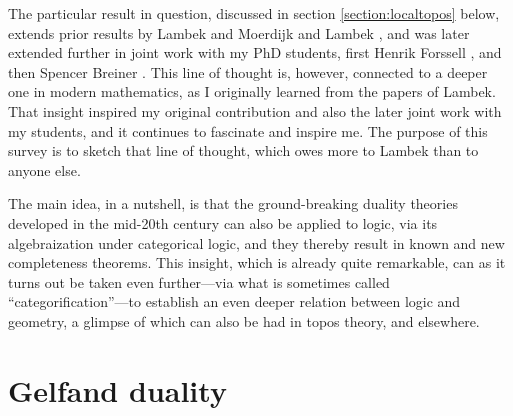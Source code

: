 \documentclass[12pt]{article}
\theoremstyle{remark}
\theoremstyle{definition}
\begin{document}
The particular result in question, discussed in section \ref{section:localtopos} below, extends prior results by Lambek and Moerdijk \cite{LM} and Lambek \cite{L2}, and was later extended further in joint work with my  PhD students, first Henrik Forssell \cite{AF}, and then Spencer Breiner \cite{B}.  This line of thought is, however, connected to a deeper one in modern mathematics, as I originally learned from the papers of Lambek.  That insight inspired  my  original contribution and also the later joint work with my students, and it continues to fascinate and inspire me.   The purpose of this survey is to sketch that line of thought, which owes more to Lambek than to anyone else.  

The main idea, in a nutshell, is that the ground-breaking duality theories developed in the mid-20th century can also be applied to logic, via its algebraization under categorical logic, and they thereby result in known and new completeness theorems.  This insight, which is already quite remarkable, can as it turns out be taken even further---via what is sometimes called ``categorification''---to establish an even deeper relation between logic and geometry, a glimpse of which can also be had in topos theory, and elsewhere.

\section{Gelfand duality}
\end{document}
